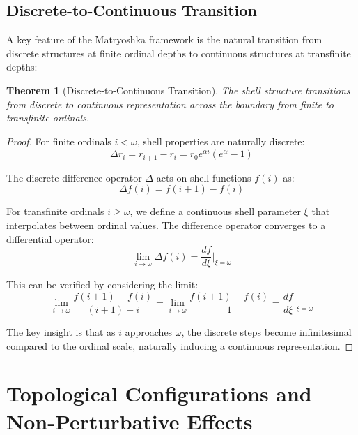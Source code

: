 \documentclass[12pt,a4paper]{article}
\newtheorem{theorem}{Theorem}[section]
\begin{document}
\subsection{Discrete-to-Continuous Transition}
\label{subsec:discrete-continuous}

A key feature of the Matryoshka framework is the natural transition from discrete structures at finite ordinal depths to continuous structures at transfinite depths:

\begin{theorem}[Discrete-to-Continuous Transition]
\label{thm:discrete-continuous}
The shell structure transitions from discrete to continuous representation across the boundary from finite to transfinite ordinals.
\end{theorem}

\begin{proof}
For finite ordinals $i < \omega$, shell properties are naturally discrete:
\begin{equation}
\Delta r_i = r_{i+1} - r_i = r_0 e^{\alpha i} (e^{\alpha} - 1)
\end{equation}

The discrete difference operator $\Delta$ acts on shell functions $f(i)$ as:
\begin{equation}
\Delta f(i) = f(i+1) - f(i)
\end{equation}

For transfinite ordinals $i \geq \omega$, we define a continuous shell parameter $\xi$ that interpolates between ordinal values. The difference operator converges to a differential operator:
\begin{equation}
\lim_{i \to \omega} \Delta f(i) = \frac{df}{d\xi}|_{\xi=\omega}
\end{equation}

This can be verified by considering the limit:
\begin{equation}
\lim_{i \to \omega} \frac{f(i+1) - f(i)}{(i+1) - i} = \lim_{i \to \omega} \frac{f(i+1) - f(i)}{1} = \frac{df}{d\xi}|_{\xi=\omega}
\end{equation}

The key insight is that as $i$ approaches $\omega$, the discrete steps become infinitesimal compared to the ordinal scale, naturally inducing a continuous representation.
\end{proof}

\section{Topological Configurations and Non-Perturbative Effects}
\label{sec:topological}
\end{document}
